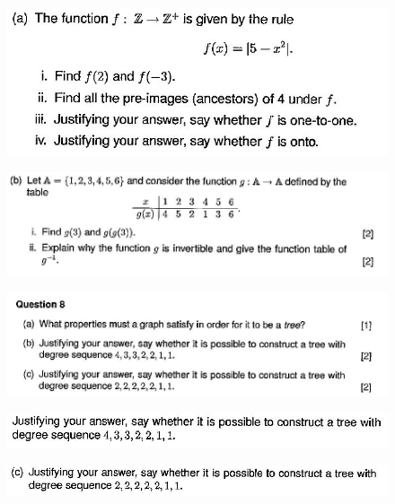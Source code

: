 \documentclass[]{article}
\begin{document}
	\newpage
	\begin{figure}[h!]
		\centering     
		\includegraphics[width=1.5\linewidth]{HC-2014-ZA-Q4a} 
	\end{figure}
	\newpage
	\begin{figure}[h!]
		\centering    
		\includegraphics[width=1.5\linewidth]{HC-2014-ZA-Q4b}    
	\end{figure}
	\newpage
	\begin{figure}[h!]
		\centering 
		\includegraphics[width=1.5\linewidth]{HC-2014-ZA-Q8abc}  
	\end{figure}
	\newpage
	\begin{figure}[h!]
		\centering 
		\includegraphics[width=1.5\linewidth]{HC-2014-ZA-Q8b}    
	\end{figure}
	\newpage
	\begin{figure}[h!]
		\centering 
		\includegraphics[width=1.5\linewidth]{HC-2014-ZA-Q8c} 
	\end{figure}
\end{document}
